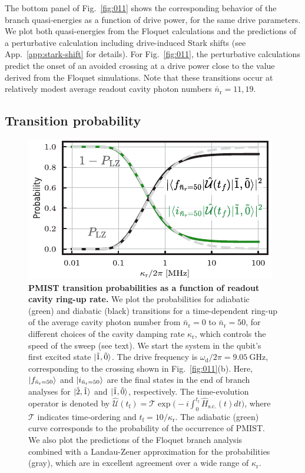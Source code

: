 \documentclass[%
reprint,
superscriptaddress,
 amsmath,amssymb,
 aps,
 prx,
longbibliography,
floatfix,
]{revtex4-2}
\begin{document}
The bottom panel of Fig.~\ref{fig:011} shows the corresponding behavior of the branch quasi-energies as a function of drive power, for the same drive parameters. We plot both quasi-energies from the Floquet calculations and the predictions of a perturbative calculation including drive-induced Stark shifts (see App.~\ref{app:stark-shift} for details). For Fig.~\ref{fig:011}, the perturbative calculations predict the onset of an avoided crossing at a drive power close to the value derived from the Floquet simulations. Note that these transitions occur at relatively modest average readout cavity photon numbers $\bar n_\textrm{r}=11,19$.

\subsection{Transition probability}\label{sec:LZ}
\begin{figure}[t]
    \centering
    \includegraphics[width=\linewidth]{Figures/LZ.pdf}
    \caption{
        {\bf PMIST transition probabilities as a function of readout cavity ring-up rate.}
        We plot the probabilities for adiabatic (green) and diabatic (black) transitions for a time-dependent ring-up of the average cavity photon number from $\bar{n}_\textrm{r} = 0$ to $\bar{n}_\textrm{r} = 50$, for different choices of the cavity damping rate $\kappa_\textrm{r}$, which controls the speed of the sweep (see text). We start the system in the qubit's first excited state $\ket{\tilde{1},\tilde{0}}$. The drive frequency is $\omega_\textrm{d}/2\pi=9.05 \ \mathrm{GHz}$, corresponding to the crossing shown in Fig.~\ref{fig:011}(b). Here, $\ket{f_{\bar n_\textrm{r}=50}}$ and $\ket{i_{\bar n_\textrm{r}=50}}$ are the final states in the end of branch analyses for $\ket{\tilde{2},\tilde{1}}$ and $\ket{\tilde{1},\tilde{0}}$, respectively. The time-evolution operator is denoted by $\hat{\mathcal{U}}(t_\textrm{f})=\mathcal{T}\exp\big(-i\int^{t_\textrm{f}}_{0} \hat H_\textrm{s.c.}(t)dt\big)$, where $\mathcal{T}$ indicates time-ordering and $t_\textrm{f}=10/\kappa_\textrm{r}$. The adiabatic (green) curve corresponds to the probability of the occurrence of PMIST. We also plot the predictions of the Floquet branch analysis combined with a Landau-Zener approximation for the probabilities (gray), which are in excellent agreement over a wide range of $\kappa_\textrm{r}$.}
    \label{fig:LZ}
\end{figure}
\end{document}
